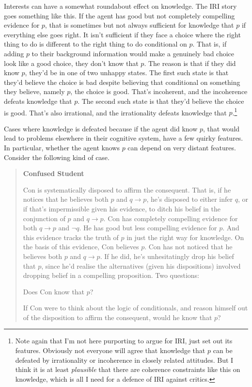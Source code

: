 \documentclass[oneside, a4paper]{book}
\begin{document}
Interests can have a somewhat roundabout effect on knowledge. The IRI story goes something like this. If the agent has good but not completely compelling evidence for $p$, that is sometimes but not always sufficient for knowledge that $p$ if everything else goes right. It isn't sufficient if they face a choice where the right thing to do is different to the right thing to do conditional on $p$. That is, if adding $p$ to their background information would make a genuinely bad choice look like a good choice, they don't know that $p$. The reason is that if they did know $p$, they'd be in one of two unhappy states. The first such state is that they'd believe the choice is bad despite believing that conditional on something they believe, namely $p$, the choice is good. That's incoherent, and the incoherence defeats knowledge that $p$. The second such state is that they'd believe the choice is good. That's also irrational, and the irrationality defeats knowledge that $p$.\footnote{Note again that I'm not here purporting to argue for IRI, just set out its features. Obviously not everyone will agree that knowledge that $p$ can be defeated by irrationality or incoherence in closely related attitudes. But I think it is at least \textit{plausible} that there are coherence constraints like this on knowledge, which is all I need for a defence of IRI against critics.} 

Cases where knowledge is defeated because if the agent did know $p$, that would lead to problems elsewhere in their cognitive system, have a few quirky features. In particular, whether the agent knows $p$ can depend on very distant features. Consider the following kind of case.

\begin{quote}

\textbf{Confused Student}

Con is systematically disposed to affirm the consequent. That is, if he notices that he believes both $p$ and $q \rightarrow p$, he's disposed to either infer $q$, or if that's impermissible given his evidence, to ditch his belief in the conjunction of $p$ and $q \rightarrow p$. Con has completely compelling evidence for both $q \rightarrow p$ and $\neg q$. He has good but less compelling evidence for $p$. And this evidence tracks the truth of $p$ in just the right way for knowledge. On the basis of this evidence, Con believes $p$. Con has not noticed that he believes both $p$ and $q \rightarrow p$. If he did, he's unhesitatingly drop his belief that $p$, since he'd realise the alternatives (given his dispositions) involved dropping belief in a compelling proposition. Two questions:
\begin{itemize*}
\item Does Con know that $p$?
\item If Con were to think about the logic of conditionals, and reason himself out of the disposition to affirm the consequent, would he know that $p$?
\end{itemize*}
\end{quote}
\end{document}
